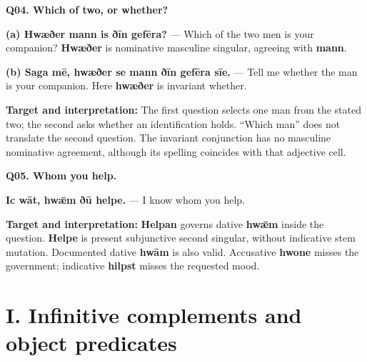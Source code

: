 \par\begin{minipage}{\linewidth}\raggedright
\textbf{Q04. Which of two, or whether?}

\textbf{(a) Hwæðer mann is ðīn gefēra?} — Which of the two men is your companion? \textbf{Hwæðer} is nominative masculine singular, agreeing with \textbf{mann}.

\textbf{(b) Saga mē, hwæðer se mann ðīn gefēra sīe.} — Tell me whether the man is your companion. Here \textbf{hwæðer} is invariant whether.

\textbf{Target and interpretation:} The first question selects one man from the stated two; the second asks whether an identification holds. “Which man” does not translate the second question. The invariant conjunction has no masculine nominative agreement, although its spelling coincides with that adjective cell.

\end{minipage}\par\addvspace{4pt}

\par\begin{minipage}{\linewidth}\raggedright
\textbf{Q05. Whom you help.}

\textbf{Ic wāt, hwǣm ðū helpe.} — I know whom you help.

\textbf{Target and interpretation:} \textbf{Helpan} governs dative \textbf{hwǣm} inside the question. \textbf{Helpe} is present subjunctive second singular, without indicative stem mutation. Documented dative \textbf{hwām} is also valid. Accusative \textbf{hwone} misses the government; indicative \textbf{hilpst} misses the requested mood.

\end{minipage}\par\addvspace{4pt}

\section*{I. Infinitive complements and object predicates}

